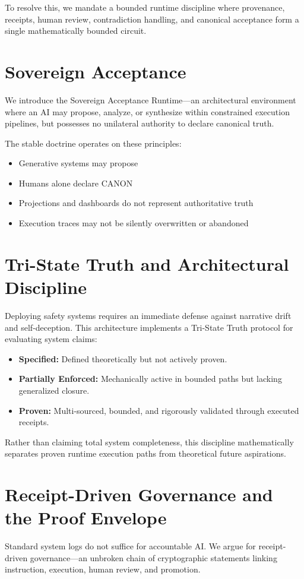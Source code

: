 \documentclass{article}
\begin{document}
To resolve this, we mandate a bounded runtime discipline where provenance, receipts, human review, contradiction handling, and canonical acceptance form a single mathematically bounded circuit.

\section{Sovereign Acceptance}
We introduce the Sovereign Acceptance Runtime—an architectural environment where an AI may propose, analyze, or synthesize within constrained execution pipelines, but possesses no unilateral authority to declare canonical truth. 

The stable doctrine operates on these principles:
\begin{itemize}
    \item Generative systems may propose
    \item Humans alone declare CANON
    \item Projections and dashboards do not represent authoritative truth
    \item Execution traces may not be silently overwritten or abandoned
\end{itemize}

\section{Tri-State Truth and Architectural Discipline}
Deploying safety systems requires an immediate defense against narrative drift and self-deception. This architecture implements a Tri-State Truth protocol for evaluating system claims:
\begin{itemize}
    \item \textbf{Specified:} Defined theoretically but not actively proven.
    \item \textbf{Partially Enforced:} Mechanically active in bounded paths but lacking generalized closure.
    \item \textbf{Proven:} Multi-sourced, bounded, and rigorously validated through executed receipts.
\end{itemize}
Rather than claiming total system completeness, this discipline mathematically separates proven runtime execution paths from theoretical future aspirations.

\section{Receipt-Driven Governance and the Proof Envelope}
Standard system logs do not suffice for accountable AI. We argue for receipt-driven governance—an unbroken chain of cryptographic statements linking instruction, execution, human review, and promotion. 
\end{document}
